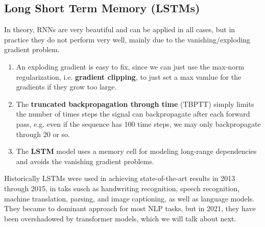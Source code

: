 \documentclass{article}
\theoremstyle{definition}
\theoremstyle{remark}
\theoremstyle{definition}
\begin{document}
\subsection{Long Short Term Memory (LSTMs)}

In theory, RNNs are very beautiful and can be applied in all cases, but in practice they do not perform very well, mainly due to the vanishing/exploding gradient problem. 
\begin{enumerate}
    \item An exploding gradient is easy to fix, since we can just use the max-norm regularization, i.e. \textbf{gradient clipping}, to just set a max vamlue for the gradients if they grow too large. 
    \item The \textbf{truncated backpropagation through time} (TBPTT) simply limits the number of times steps the signal can backpropagate after each forward pass, e.g. even if the sequence has 100 time steps, we may only backpropagate through 20 or so. 
    \item The \textbf{LSTM} model uses a memory cell for modeling long-range dependencies and avoids the vanishing gradient problems. 
\end{enumerate}
Historically LSTMs were used in achieving state-of-the-art results in 2013 through 2015, in taks susch as handwriting recognition, speech recognition, machine translation, parsing, and image captioning, as well as language models. They became to dominant approach for most NLP tasks, but in 2021, they have been overshadowed by transformer models, which we will talk about next. 
\end{document}
